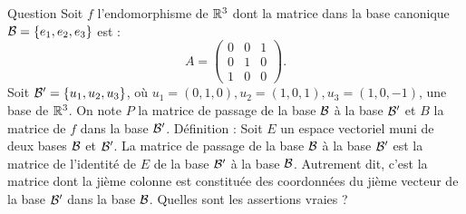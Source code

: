 \begin{multi}[multiple,feedback=
{On vérifie que \(f\) est bijective car le rang de la matrice \(A\) est \(3\) et que 
\[B= \left(\begin{array}{rcc}
1&0&0\\
0&1&0\\ 
0&0&-1\\
\end{array}\right).\]
Soit \(E\) est un espace vectoriel, de dimension finie, muni de deux bases \({\cal B}\) et \({\cal B}'\) et \(f\) un endomorphisme de \(E\). On note \(P\) la matrice de passage de la base \({\cal B}\) à la base \({\cal B}'\), \(A\) la matrice de \(f\) dans la base \({\cal B}\) et \(B\) la matrice de \(f\) dans la base \({\cal B}'\). Alors \(AP=PB\). De cette relation, on déduit que \(A^n=PB^nP^{-1}\). Par définition, on a :
\[P= \left(\begin{array}{rcc}
0&1&1\\
1&0&0\\ 
0&1&-1\end{array}\right)\Rightarrow P^{-1}= \frac{1}{2}\left(\begin{array}{rcc}
0&2&0\\
1&0&1\\ 
1&0&-1\end{array}\right).\]
D'où, pour tout \(n\ge1\),
\(\displaystyle A^n= \frac{1}{2}\left(\begin{array}{rcc}
1+(-1)^n&0&1-(-1)^n\\
0 \quad &2&0\\ 
1-(-1)^n&0&1+(-1)^n\\
\end{array}\right)\)
}]{Question}
Soit \(f\) l'endomorphisme de \(\mathbb{R}^3\) dont la matrice dans la base canonique \({\cal B}=\{e_1,e_2,e_3\}\) est : 
\[A=\left(\begin{array}{rcc}0&0&1\\0&1&0\\ 
1&0&0\end{array}\right).\]
Soit \({\cal B}' = \{ u_1, u_2,  u_3\}\), où \(u_1=(0,1,0), u_2=(1,0,1), u_3=(1,0,-1)\), une base de \(\mathbb{R}^3\). On note \(P\) la matrice de passage de la base \({\cal B}\) à la base \({\cal B}'\) et \(B\) la matrice de \(f\) dans la base \({\cal B}'\).
\vskip0mm
Définition : Soit \(E\) un espace vectoriel muni de deux bases \({\cal {B}}\) et \({\cal {B}}'\). La matrice de passage de la base \({\cal {B}}\) à la base \({\cal {B}}'\) est la matrice de l'identité de \(E\) de la base \({\cal {B}}'\) à la base \({\cal {B}}\). Autrement dit, c'est la matrice dont la jième colonne est constituée des coordonnées du jième vecteur de la base \({\cal {B}'}\) dans la base \({\cal {B}}\).
\vskip0mm
Quelles sont les assertions vraies ?


\end{multi}
